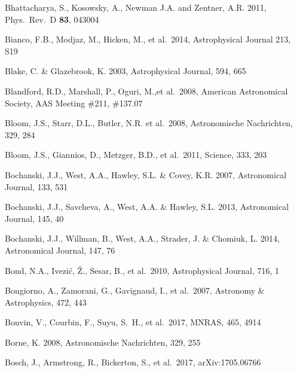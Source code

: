 \documentclass[twocolumn]{aastex61}
\begin{document}
\begin{thebibliography}{}
 Bhattacharya, S., Kosowsky, A., Newman J.A. and Zentner, A.R. 2011, Phys.\ Rev.\ D {\bf 83}, 043004

 Bianco, F.B., Modjaz, M., Hicken, M., et al.~2014, Astrophysical Journal 213, S19

 Blake, C. \& Glazebrook, K. 2003, Astrophysical Journal, 594, 665

 Blandford, R.D., Marshall, P., Oguri, M.,et al.~2008, American Astronomical Society, AAS Meeting \#211, \#137.07

 Bloom, J.S., Starr, D.L., Butler, N.R. et al.~2008, Astronomische Nachrichten, 329, 284


 Bloom, J.S., Giannios, D., Metzger, B.D., et al.~2011, Science, 333, 203

 Bochanski, J.J., West, A.A., Hawley, S.L. \& Covey, K.R. 2007, Astronomical Journal, 133, 531

 Bochanski, J.J., Savcheva, A., West, A.A. \& Hawley, S.L. 2013, Astronomical Journal, 145, 40

 Bochanski, J.J., Willman, B., West, A.A., Strader, J. \& Chomiuk, L. 2014, Astronomical Journal, 147, 76

 Bond, N.A.,  Ivezi\'{c}, \v{Z}., Sesar, B., et al.~2010, Astrophysical Journal, 716, 1

 Bongiorno, A., Zamorani, G., Gavignaud, I., et al.~2007, Astronomy \& Astrophysics, 472, 443

 Bonvin, V., Courbin, F., Suyu, S.~H., et al.\ 2017, MNRAS, 465, 4914

 Borne, K. 2008, Astronomische Nachrichten, 329, 255


 Bosch, J., Armstrong, R., Bickerton, S., et al.~2017,  arXiv:1705.06766


\end{thebibliography}
\end{document}

